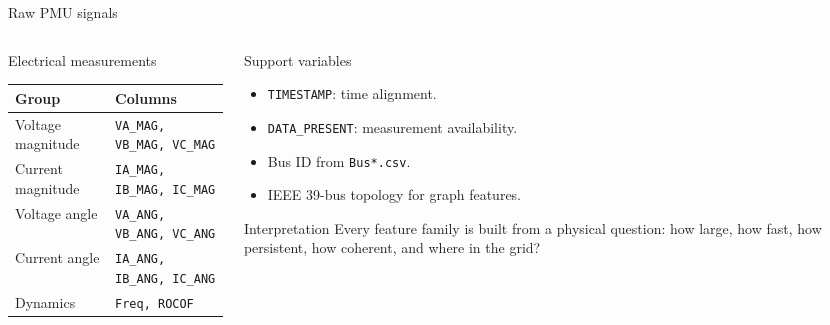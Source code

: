 \documentclass[10pt,aspectratio=169]{beamer}
\newcommand{\code}[1]{\texttt{\footnotesize #1}}
\begin{document}
\begin{frame}{Raw PMU signals}
\small
\begin{columns}[T,totalwidth=\textwidth]
\begin{column}{0.49\textwidth}
\begin{block}{Electrical measurements}
\begin{tabular}{ll}
\toprule
Group & Columns\\
\midrule
Voltage magnitude & \code{VA\_MAG, VB\_MAG, VC\_MAG}\\
Current magnitude & \code{IA\_MAG, IB\_MAG, IC\_MAG}\\
Voltage angle & \code{VA\_ANG, VB\_ANG, VC\_ANG}\\
Current angle & \code{IA\_ANG, IB\_ANG, IC\_ANG}\\
Dynamics & \code{Freq, ROCOF}\\
\bottomrule
\end{tabular}
\end{block}
\end{column}
\begin{column}{0.47\textwidth}
\begin{block}{Support variables}
\begin{itemize}
  \item \code{TIMESTAMP}: time alignment.
  \item \code{DATA\_PRESENT}: measurement availability.
  \item Bus ID from \code{Bus*.csv}.
  \item IEEE 39-bus topology for graph features.
\end{itemize}
\end{block}
\begin{exampleblock}{Interpretation}
Every feature family is built from a physical question: how large, how fast, how persistent, how coherent, and where in the grid?
\end{exampleblock}
\end{column}
\end{columns}
\end{frame}
\end{document}
